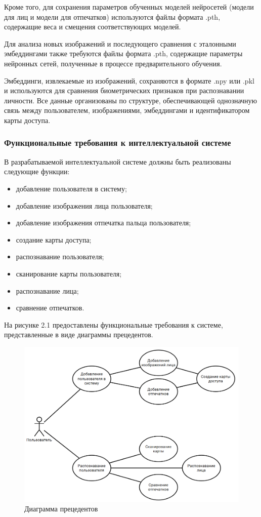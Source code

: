 Кроме того, для сохранения параметров обученных моделей нейросетей (модели для лиц и модели для отпечатков) используются файлы формата .pth, содержащие веса и смещения соответствующих моделей.

Для анализа новых изображений и последующего сравнения с эталонными эмбеддингами также требуются файлы формата .pth, содержащие параметры нейронных сетей, полученные в процессе предварительного обучения.

Эмбеддинги, извлекаемые из изображений, сохраняются в формате .npy или .pkl и используются для сравнения биометрических признаков при распознавании личности. Все данные организованы по структуре, обеспечивающей однозначную связь между пользователем, изображениями, эмбеддингами и идентификатором карты доступа.

\subsubsection{Функциональные требования к интеллектуальной системе}

В разрабатываемой интеллектуальной системе должны
быть реализованы следующие функции: 
\begin{itemize}
	\item добавление пользователя в систему;
   	\item добавление изображения лица пользователя;
    \item добавление изображения отпечатка пальца пользователя;
    \item создание карты доступа;
    \item распознавание пользователя;
	\item сканирование карты пользователя;
	\item распознавание лица;
	\item сравнение отпечатков.
\end{itemize}

На рисунке 2.1 предоставлены функциональные требования к системе,
представленные в виде диаграммы прецедентов.
\begin{figure}[H]
	\centering
	\includegraphics[width=1\linewidth]{images/UML}
	\caption{Диаграмма прецедентов}
	\label{fig:uml}
\end{figure}

